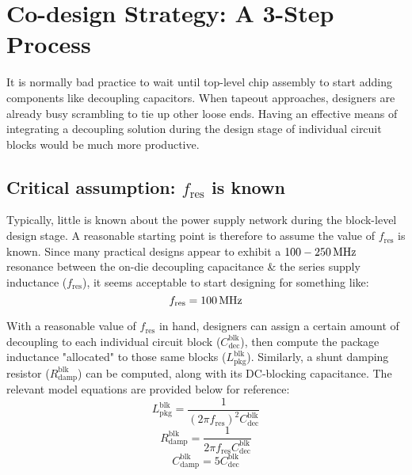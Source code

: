 \section{Co-design Strategy: A 3-Step Process}
\par It is normally bad practice to wait until top-level chip assembly to
start adding components like decoupling capacitors. When tapeout approaches,
designers are already busy scrambling to tie up other loose ends.
Having an effective means of integrating a decoupling solution during
the design stage of individual circuit blocks would be much more
productive.
%
\subsection{Critical assumption: $f_\mathrm{res}$ is known}
\par Typically, little is known about the power supply network during the
block-level design stage.  A reasonable starting point is therefore to assume the
value of $f_\mathrm{res}$ is known. Since many practical designs appear to
exhibit a $100-250\mathrm{\,MHz}$ resonance between the on-die decoupling capacitance
\& the series supply inductance ($f_\mathrm{res}$), it seems acceptable to start
designing for something like:
\begin{equation}
	f_\mathrm{res}=100\mathrm{\,MHz}
\end{equation}
%
\par With a reasonable value of $f_\mathrm{res}$ in hand, designers can
assign a certain amount of decoupling to each individual circuit block
($C_\mathrm{dec}^\mathrm{blk}$), then compute the package inductance
"allocated" to those same blocks ($L_\mathrm{pkg}^\mathrm{blk}$).
Similarly, a shunt damping resistor ($R_\mathrm{damp}^\mathrm{blk}$)
can be computed, along with its DC-blocking capacitance. The relevant
model equations are provided below for reference:
%
\begin{equation}
	L_\mathrm{pkg}^\mathrm{blk} = \frac{1}{(2\pi f_\mathrm{res})^2 C_\mathrm{dec}^\mathrm{blk}}
\end{equation}
\begin{equation}
	R_\mathrm{damp}^\mathrm{blk} = \frac{1}{2\pi f_\mathrm{res}C_\mathrm{dec}^\mathrm{blk}}
\end{equation}
\begin{equation}
	C_\mathrm{damp}^\mathrm{blk} = 5C_\mathrm{dec}^\mathrm{blk}
\end{equation}
%
